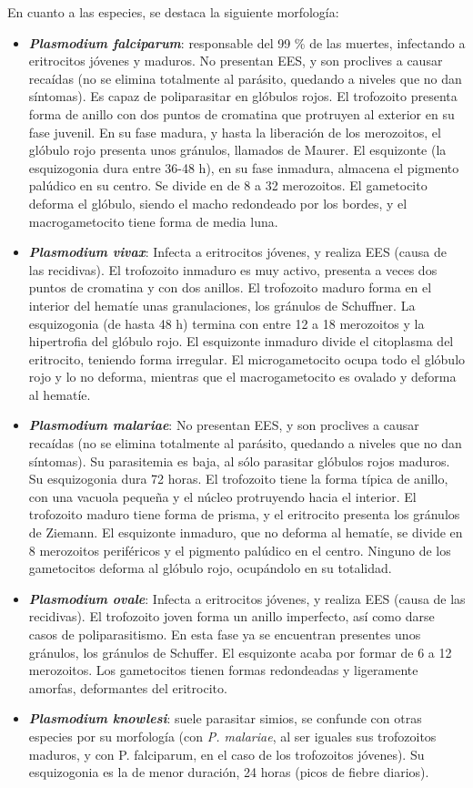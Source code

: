 En cuanto a las especies, se destaca la siguiente morfología:
\begin{itemize}[itemsep=0pt,parsep=0pt,topsep=0pt,partopsep=0pt]
	\item\textit{\textbf{Plasmodium falciparum}}: responsable del 99 \% de las muertes, infectando a eritrocitos jóvenes y maduros. No presentan EES, y son proclives a causar recaídas (no se elimina totalmente al parásito, quedando a niveles que no dan síntomas). Es capaz de poliparasitar en glóbulos rojos. El trofozoito presenta forma de anillo con dos puntos de cromatina que protruyen al exterior en su fase juvenil. En su fase madura, y hasta la liberación de los merozoitos, el glóbulo rojo presenta unos gránulos, llamados de Maurer. El esquizonte (la esquizogonia dura entre 36-48 h), en su fase inmadura, almacena el pigmento palúdico en su centro. Se divide en de 8 a 32 merozoitos. El gametocito deforma el glóbulo, siendo el macho redondeado por los bordes, y el macrogametocito tiene forma de media luna.
	\item\textit{\textbf{Plasmodium vivax}}: Infecta a eritrocitos jóvenes, y realiza EES (causa de las recidivas). El trofozoito inmaduro es muy activo, presenta a veces dos puntos de cromatina y con dos anillos. El trofozoito maduro forma en el interior del hematíe unas granulaciones, los gránulos de Schuffner. La esquizogonia (de hasta 48 h) termina con entre 12 a 18 merozoitos y la hipertrofia del glóbulo rojo. El esquizonte inmaduro divide el citoplasma del eritrocito, teniendo forma irregular. El microgametocito ocupa todo el glóbulo rojo y lo no deforma, mientras que el macrogametocito es ovalado y deforma al hematíe.
	\item\textit{\textbf{Plasmodium malariae}}: No presentan EES, y son proclives a causar recaídas (no se elimina totalmente al parásito, quedando a niveles que no dan síntomas). Su parasitemia es baja, al sólo parasitar glóbulos rojos maduros. Su esquizogonia dura 72 horas.  El trofozoito tiene la forma típica de anillo, con una vacuola pequeña y el núcleo protruyendo hacia el interior. El trofozoito maduro tiene forma de prisma, y el eritrocito presenta los gránulos de Ziemann. El esquizonte inmaduro, que no deforma al hematíe, se divide en 8 merozoitos periféricos y el pigmento palúdico en el centro. Ninguno de los gametocitos deforma al glóbulo rojo, ocupándolo en su totalidad. 
	\item\textit{\textbf{Plasmodium ovale}}: Infecta a eritrocitos jóvenes, y realiza EES (causa de las recidivas). El trofozoito joven forma un anillo imperfecto, así como darse casos de poliparasitismo. En esta fase ya se encuentran presentes unos gránulos, los gránulos de Schuffer. El esquizonte acaba por formar de 6 a 12 merozoitos. Los gametocitos tienen formas redondeadas y ligeramente amorfas, deformantes del eritrocito.
	\item\textit{\textbf{Plasmodium knowlesi}}: suele parasitar simios, se confunde con otras especies por su morfología (con \textit{P. malariae}, al ser iguales sus trofozoitos maduros, y con P. falciparum, en el caso de los trofozoitos jóvenes). Su esquizogonia es la de menor duración, 24 horas (picos de fiebre diarios).
\end{itemize}
